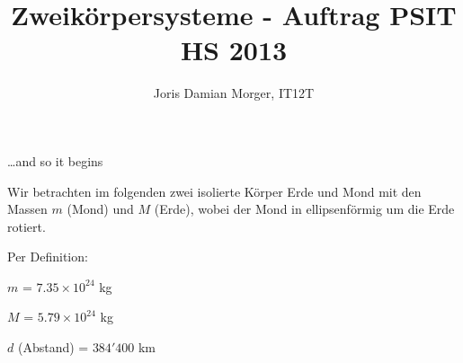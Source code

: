 \documentclass{article}
\author{Joris Damian Morger, IT12T}
\title{Zweikörpersysteme - Auftrag PSIT HS 2013}
\begin{document}
	
	
	\maketitle


	\ldots and so it begins

	Wir betrachten im folgenden zwei isolierte Körper Erde und Mond mit den Massen $m$ (Mond) und $M$ (Erde), wobei der Mond in ellipsenförmig um die Erde rotiert.

	Per Definition:
	
	$m$ = $7.35 \times 10^{24}$ kg \cite{wiki1}

	$M$ = $5.79 \times 10^{24}$ kg \cite{wiki1}

	$d$ (Abstand) = $384'400$ km \cite{wiki2}


\end{document}
